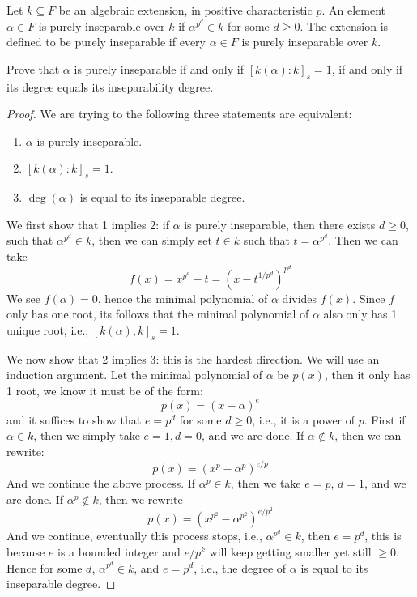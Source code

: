 \documentclass[openany]{book}
\begin{document}
    
    
    \begin{prob}
    Let \( k \subseteq F \) be an algebraic extension, in positive characteristic \( p \). An element \( \alpha \in F \) is purely inseparable over \( k \) if \( \alpha^{p^d} \in k \) for some \( d \geq 0 \). The extension is defined to be purely inseparable if every \( \alpha \in F \) is purely inseparable over \( k \).
    
    Prove that \( \alpha \) is purely inseparable if and only if \([k(\alpha) : k]_s = 1\), if and only if its degree equals its inseparability degree.
    \end{prob}
    \begin{proof}
        We are trying to the following three statements are equivalent:
        \begin{enumerate}
            \item $\alpha$ is purely inseparable.
            \item $[k(\alpha):k]_s=1$.
            \item $\deg(\alpha)$ is equal to its inseparable degree.
        \end{enumerate}
        We first show that 1 implies 2: if $\alpha$ is purely inseparable, then there exists $d\geq 0$, such that $\alpha^{p^d}\in k$, then we can simply set $t\in k$ such that $t=\alpha^{p^d}$. Then we can take 
        \begin{equation*}
            f(x)=x^{p^d}-t=(x-t^{1/p^d})^{p^d}
        \end{equation*}
        We see $f(\alpha)=0$, hence the minimal polynomial of $\alpha$ divides $f(x)$. Since $f$ only has one root, its follows that the minimal polynomial of $\alpha$ also only has 1 unique root, i.e., $[k(\alpha),k]_s=1$.
    
        We now show that 2 implies 3: this is the hardest direction. We will use an induction argument. Let the minimal polynomial of $\alpha$ be $p(x)$, then it only has 1 root, we know it must be of the form:
        \begin{equation*}
            p(x)=(x-\alpha)^e
        \end{equation*}
        and it suffices to show that $e=p^d$ for some $d\geq 0$, i.e., it is a power of $p$. First if $\alpha\in k$, then we simply take $e=1, d=0$, and we are done. If $\alpha\not\in k$, then we can rewrite:
        \begin{equation*}
            p(x)=(x^p-\alpha^p)^{e/p}
        \end{equation*}
        And we continue the above process. If $\alpha^p\in k$, then we take $e=p$, $d=1$, and we are done. If $\alpha^p\not\in k$, then we rewrite 
        \begin{equation*}
            p(x)=(x^{p^2}-\alpha^{p^2})^{e/p^2}
        \end{equation*}
        And we continue, eventually this process stops, i.e., $\alpha^{p^d}\in k$, then $e=p^d$, this is because $e$ is a bounded integer and $e/p^k$ will keep getting smaller yet still $\geq0$. Hence for some $d$, $\alpha^{p^d}\in k$, and $e=p^d$, i.e., the degree of $\alpha$ is equal to its inseparable degree.
    

\end{proof}
\end{document}
